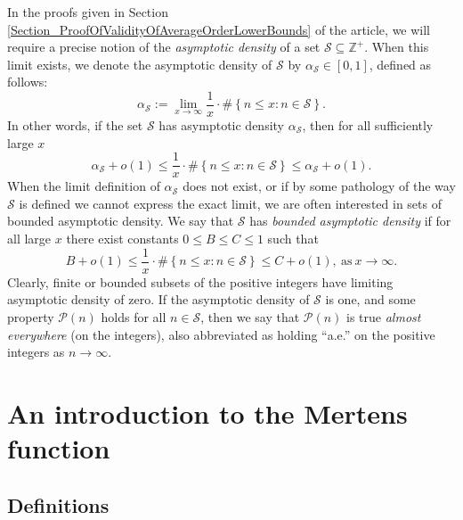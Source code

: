 \documentclass[11pt,reqno,a4letter]{article}
\numberwithin{figure}{section}
\numberwithin{table}{section}
\theoremstyle{plain}
\numberwithin{theorem}{section}
\theoremstyle{definition}
\begin{document}
In the proofs given in Section \ref{Section_ProofOfValidityOfAverageOrderLowerBounds} 
of the article, we will require a precise notion of the 
\emph{asymptotic density} of a set $\mathcal{S} \subseteq \mathbb{Z}^{+}$. 
When this limit exists, we denote the asymptotic density of 
$\mathcal{S}$ by $\alpha_{\mathcal{S}} \in [0, 1]$, defined as follows: 
\[
\alpha_{\mathcal{S}} := \lim_{x \rightarrow \infty} \frac{1}{x} \cdot \#\left\{ 
     n \leq x: n \in \mathcal{S} 
     \right\}. 
\]
In other words, if the set $\mathcal{S}$ has asymptotic density $\alpha_{\mathcal{S}}$, then 
for all sufficiently large $x$ 
\[
\alpha_{\mathcal{S}} + o(1) \leq \frac{1}{x} \cdot \#\left\{ 
     n \leq x: n \in \mathcal{S} \right\} \leq 
     \alpha_{\mathcal{S}} + o(1). 
\]
When the limit definition of $\alpha_{\mathcal{S}}$ does not exist, or if by some 
pathology of the way $\mathcal{S}$ is defined we cannot express the exact limit, we are often 
interested in sets of bounded asymptotic density. We say that $\mathcal{S}$ has 
\emph{bounded asymptotic density} if for all large $x$ there exist constants $0 \leq B \leq C \leq 1$ 
such that 
\[
B + o(1) \leq \frac{1}{x} \cdot \#\left\{ 
     n \leq x: n \in \mathcal{S} \right\} \leq C + o(1), \mathrm{\ as\ } x \rightarrow \infty. 
\]
Clearly, finite or bounded subsets of the positive integers have limiting asymptotic density of zero. 
If the asymptotic density of $\mathcal{S}$ is one, and some property $\mathcal{P}(n)$ holds 
for all $n \in \mathcal{S}$, then we say that $\mathcal{P}(n)$ is true 
\emph{almost everywhere} (on the integers), also abbreviated as holding ``a.e.'' on the positive integers 
as $n \rightarrow \infty$. 

\newpage
\section{An introduction to the Mertens function} 
\label{subSection_MertensMxClassical_Intro} 

\subsection{Definitions} 
\end{document}
